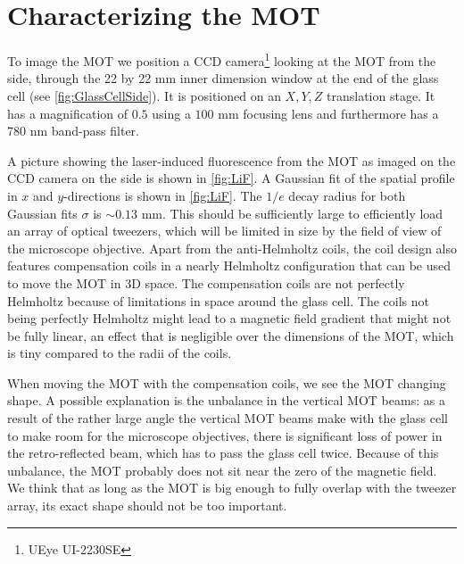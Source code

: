\section{Characterizing the MOT}\label{sec:MOTresult}

To image the MOT we position a CCD camera\footnote{UEye UI-2230SE} looking at the MOT from the side, through the 22 by 22 mm inner dimension window at the end of the glass cell (see \cref{fig:GlassCellSide}).
It is positioned on an $X,Y,Z$ translation stage.
It has a magnification of $0.5$ using a $100$ mm focusing lens and furthermore has a 780 nm band-pass filter. 

A picture showing the laser-induced fluorescence from the MOT as imaged on the CCD camera on the side is shown in \cref{fig:LiF}.
A Gaussian fit of the spatial profile in $x$ and $y$-directions is shown in \cref{fig:LiF}.
The $1/e$ decay radius for both Gaussian fits $\sigma$ is $\sim 0.13$ mm. 
This should be sufficiently large to efficiently load an array of optical tweezers, which will be limited in size by the field of view of the microscope objective. 
Apart from the anti-Helmholtz coils, the coil design also features compensation coils in a nearly Helmholtz configuration that can be used to move the MOT in 3D space. 
The compensation coils are not perfectly Helmholtz because of limitations in space around the glass cell.
The coils not being perfectly Helmholtz might lead to a magnetic field gradient that might not be fully linear, an effect that is negligible over the dimensions of the MOT, which is tiny compared to the radii of the coils. 

When moving the MOT with the compensation coils, we see the MOT changing shape. 
A possible explanation is the unbalance in the vertical MOT beams: as a result of the rather large angle the vertical MOT beams make with the glass cell to make room for the microscope objectives, there is significant loss of power in the retro-reflected beam, which has to pass the glass cell twice. 
Because of this unbalance, the MOT probably does not sit near the zero of the magnetic field.
We think that as long as the MOT is big enough to fully overlap with the tweezer array, its exact shape should not be too important.


